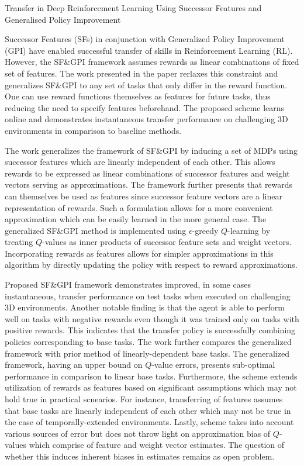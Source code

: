 \documentclass[11pt,letterpaper]{article}
\begin{document}
\begin{center}
  \large{Transfer in Deep Reinforcement Learning Using Successor Features and Generalised Policy Improvement}
\end{center}

Successor Features (SFs) in conjunction with Generalized Policy Improvement (GPI) have enabled successful transfer of skills in Reinforcement Learning (RL). However, the SF\&GPI framework assumes rewards as linear combinations of fixed set of features. The work presented in the paper rerlaxes this constraint and generalizes SF\&GPI to any set of tasks that only differ in the reward function. One can use reward functions themselves as features for future tasks, thus reducing the need to specify features beforehand. The proposed scheme learns online and demonstrates instantaneous transfer performance on challenging 3D environments in comparison to baseline methods. 

The work generalizes the framework of SF\&GPI by inducing a set of MDPs using successor features which are linearly independent of each other. This allows rewards to be expressed as linear combinations of successor features and weight vectors serving as approximations. The framework further presents that rewards can themselves be used as features since successor feature vectors are a linear representation of rewards. Such a formulation allows for a more convenient approximation which can be easily learned in the more general case. The generalized SF\&GPI method is implemented using $\epsilon$-greedy $Q$-learning by treating $Q$-values as inner products of successor feature sets and weight vectors. Incorporating rewards as features allows for simpler approximations in this algorithm by directly updating the policy with respect to reward approximations. 

Proposed SF\&GPI framework demonstrates improved, in some cases instantaneous, transfer performance on test tasks when executed on challenging 3D environments. Another notable finding is that the agent is able to perform well on tasks with negative rewards even though it was trained only on tasks with positive rewards. This indicates that the transfer policy is successfully combining policies corresponding to base tasks. The work further compares the generalized framework with prior method of linearly-dependent base tasks. The generalized framework, having an upper bound on $Q$-value errors, presents sub-optimal performance in comparison to linear base tasks. Furthermore, the scheme extends utilization of rewards as features based on significant assumptions which may not hold true in practical scnearios. For instance, transferring of features assumes that base tasks are linearly independent of each other which may not be true in the case of temporally-extended environments. Lastly, scheme takes into account various sources of error but does not throw light on approximation bias of $Q$-values which comprise of feature and weight vector estimates. The question of whether this induces inherent biases in estimates remains as open problem. 
\end{document}
